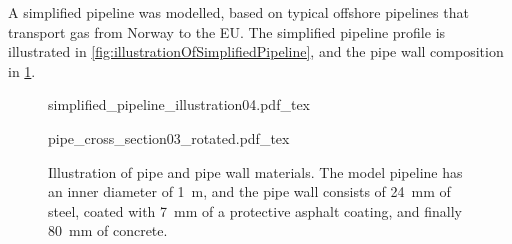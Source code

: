 A simplified pipeline was modelled, based on typical offshore pipelines that transport gas from Norway to the EU. The simplified pipeline profile is illustrated in \cref{fig:illustrationOfSimplifiedPipeline}, and the pipe wall composition in \cref{fig:pipeCrossSection}.



\begin{figure}[!ht]%
\centering%
\begin{minipage}{9.6cm}%
    {simplified_pipeline_illustration04.pdf_tex}%
    \\ %
    \parbox{0.9\textwidth}{%
        \vspace{2mm}%
        \caption{%
            Illustration of the simplified pipeline. The pipe is onshore and buried 2~m underground for the first and last 25~km, and 100~m below sea level and exposed to sea water for 600~km between the onshore sections. Figure created freely after figure in \cite{Helgaker2013Modeling}.%
            \label{fig:illustrationOfSimplifiedPipeline}%
        }%
    }%
\end{minipage}%
\hspace{0.099cm}%
\begin{minipage}{6.3cm}%
    {pipe_cross_section03_rotated.pdf_tex}%
    \caption{%
        Illustration of pipe and pipe wall materials. The model pipeline has an inner diameter of \SI{1}{\meter}, and the pipe wall consists of \SI{24}{mm} of steel, coated with \SI{7}{mm} of a protective asphalt coating, and finally \SI{80}{mm} of concrete.%
        \label{fig:pipeCrossSection}%
    }%
\end{minipage}%
\end{figure}

